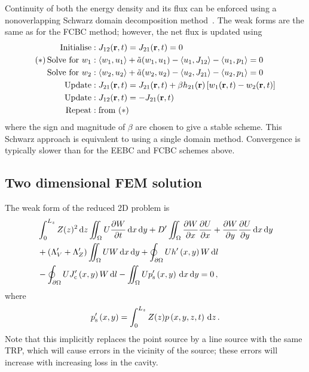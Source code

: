 \documentclass[a4paper]{article}
\numberwithin{equation}{section}
\begin{document}
Continuity of both the energy density and its flux can be enforced using a nonoverlapping Schwarz domain decomposition
method~\citep{Lions1990}. The weak forms are the same as for the FCBC method; however, the net flux is updated using
\begin{align}
\mathrm{Initialise} &: J_{12}(\boldsymbol{\mathrm{r}},t) = J_{21}(\boldsymbol{\mathrm{r}},t) = 0 \nonumber \\
\mathrm{(\ast)\,Solve\,\,for}\,\,w_1 &: \langle w_1,u_1 \rangle + \tilde{a}(w_1,u_1) - \langle u_1 , J_{12} \rangle - \langle u_1 , p_1 \rangle = 0 \nonumber \\
\mathrm{Solve\,\,for}\,\,w_2 &: \langle w_2,u_2 \rangle + \tilde{a}(w_2,u_2) - \langle u_2 , J_{21} \rangle - \langle u_2 , p_1 \rangle = 0 \nonumber \\
\mathrm{Update} &: J_{21}(\boldsymbol{\mathrm{r}},t) = J_{21}(\boldsymbol{\mathrm{r}},t) + \beta h_{21}(\boldsymbol{\mathrm{r}}) \left[ w_1(\boldsymbol{\mathrm{r}},t) - w_2(\boldsymbol{\mathrm{r}},t) \right] \nonumber \\
\mathrm{Update} &: J_{12}(\boldsymbol{\mathrm{r}},t) = -J_{21}(\boldsymbol{\mathrm{r}},t) \nonumber \\
\mathrm{Repeat} &: \mathrm{from}\,\,(\ast) \nonumber
\end{align}
where the sign and magnitude of $\beta$ are chosen to give a stable scheme. This Schwarz approach
is equivalent to using a single domain method. Convergence is typically slower than for the 
EEBC and FCBC schemes above.

\subsection[Two dimensional FEM solution]{Two dimensional FEM solution}
\label{sc:fem:2d}

The weak form of the reduced 2D problem is
\begin{align}
&\int_0^{L_z}Z(z)^2\,\mathrm{d}{z}\iint_{\Omega} U\frac{{\partial}W}{{\partial}t}\,\mathrm{d}{x}\,\mathrm{d}{y}
+D^\prime\iint_{\Omega}\frac{{\partial}W}{{\partial}x}\frac{{\partial}U}{{\partial}x}+\frac{{\partial}W}{{\partial}y}\frac{{\partial}U}{{\partial}y}\,\mathrm{d}{x}\,\mathrm{d}{y} \nonumber \\
&+\left(\Lambda_V^\prime+\Lambda_Z^\prime\right)\iint_{\Omega }UW\,\mathrm{d}{x}\,\mathrm{d}{y}
+\oint_{\partial\Omega} Uh^\prime\left(x,y\right)W\,\mathrm{d}{l} \nonumber \\
&-\oint_{\partial\Omega} UJ_{\mathrm{c}}^\prime\left(x,y\right) W\,\mathrm{d}{l}
-\iint_{\Omega} U p_{\mathrm{s}}^\prime\left(x,y\right)\,\mathrm{d}{x}\,\mathrm{d}{y}=0\,,
\end{align}
where
\begin{align}
p_{\mathrm{s}}^\prime\left(x,y\right)=\int_0^{L_z}Z(z)p\left(x,y,z,t\right)\,\mathrm{d}{z}\,.
\end{align}
Note that this implicitly replaces the point source by a line source with the same TRP, which 
will cause errors in the vicinity of the source; these errors will increase with increasing
loss in the cavity.
\end{document}
